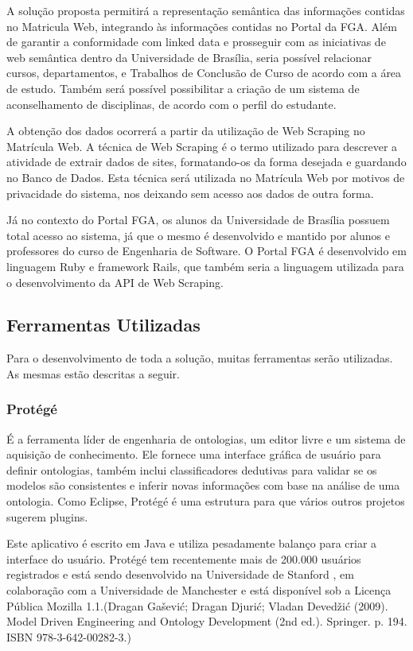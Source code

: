 
A solução proposta permitirá a representação semântica das informações contidas no Matricula Web, integrando às informações contidas no Portal da FGA. Além de garantir a conformidade com linked data e prosseguir com as iniciativas de web semântica dentro da Universidade de Brasília, seria possível relacionar cursos, departamentos, e Trabalhos de Conclusão de Curso de acordo com a área de estudo. Também será possível possibilitar a criação de um sistema de aconselhamento de disciplinas, de acordo com o perfil do estudante.

A obtenção dos dados ocorrerá a partir da utilização de Web Scraping no Matrícula Web. A técnica de Web Scraping é o termo utilizado para descrever a atividade de extrair dados de sites, formatando-os da forma desejada e guardando no Banco de Dados. Esta técnica será utilizada no Matrícula Web por motivos de privacidade do sistema, nos deixando sem acesso aos dados de outra forma.

Já no contexto do Portal FGA, os alunos da Universidade de Brasília possuem total acesso ao sistema, já que o mesmo é desenvolvido e mantido por alunos e professores do curso de Engenharia de Software. O Portal FGA é desenvolvido em linguagem Ruby e framework Rails, que também seria a linguagem utilizada para o desenvolvimento da API de Web Scraping.

\subsection{Ferramentas Utilizadas} %
\label{sub:ferramentas_utilizadas}
	
	Para o desenvolvimento de toda a solução, muitas ferramentas serão utilizadas. As mesmas estão descritas a seguir.

\subsubsection{Protégé}

	É a ferramenta líder de engenharia de ontologias, um editor livre e um sistema de aquisição de conhecimento. Ele fornece uma interface gráfica de usuário para definir ontologias, também inclui classificadores dedutivas para validar se os modelos são consistentes e inferir novas informações com base na análise de uma ontologia. Como Eclipse, Protégé é uma estrutura para que vários outros projetos sugerem plugins. 

	Este aplicativo é escrito em Java e utiliza pesadamente balanço para criar a interface do usuário. Protégé tem recentemente mais de 200.000 usuários registrados e está sendo desenvolvido na Universidade de Stanford , em colaboração com a Universidade de Manchester e está disponível sob a Licença Pública Mozilla 1.1.(Dragan Gašević; Dragan Djurić; Vladan Devedžić (2009). Model Driven Engineering and Ontology Development (2nd ed.). Springer. p. 194. ISBN 978-3-642-00282-3.)

